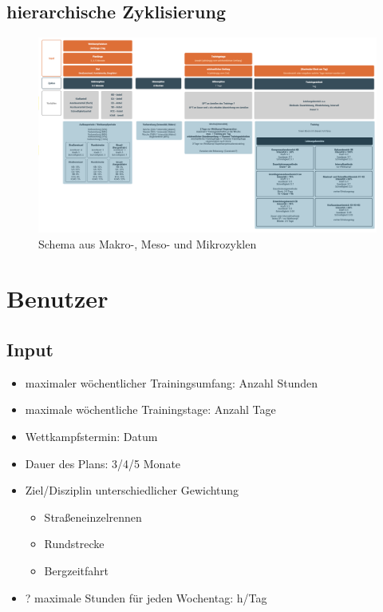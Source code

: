     \subsection{hierarchische Zyklisierung}
    \begin{figure}[htb]
    	\includegraphics[width=\textwidth]{gfx/modell.png}
    	\caption{Schema aus Makro-, Meso- und Mikrozyklen}
    	\label{fig:modellierung:schema}
    \end{figure}


\section{Benutzer}
\subsection{Input}
\begin{itemize}
    \item maximaler wöchentlicher Trainingsumfang: Anzahl Stunden
    \item maximale wöchentliche Trainingstage: Anzahl Tage
    \item Wettkampfstermin: Datum
    \item Dauer des Plans: 3/4/5 Monate
    \item Ziel/Disziplin \cite[S.11]{Radsporttraining} unterschiedlicher Gewichtung\cite[S.14]{Radsporttraining}
    \begin{itemize}
        \item Straßeneinzelrennen
        \item Rundstrecke
        \item Bergzeitfahrt
    \end{itemize}
    \item ? maximale Stunden für jeden Wochentag: h/Tag
\end{itemize}

